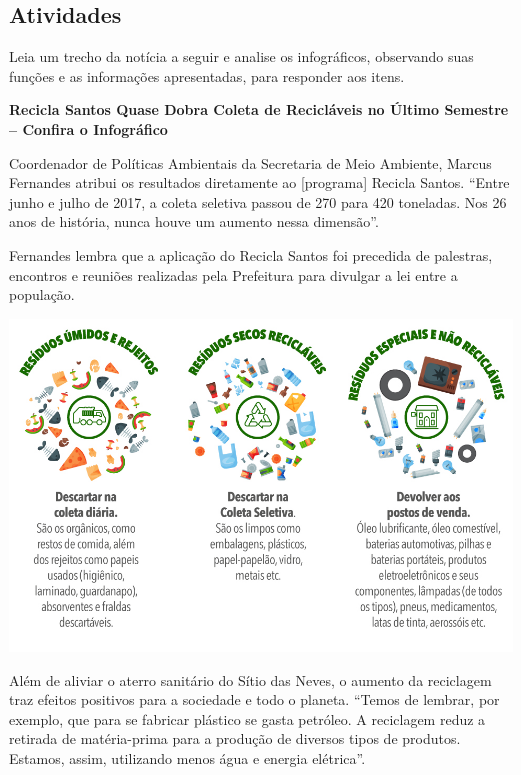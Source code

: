 \begin{conteudo}
\begin{conteudo}
\begin{conteudo}
\begin{conteudo}
\begin{conteudo}
\section*{Atividades}


Leia um trecho da notícia a seguir e analise os infográficos,
observando suas funções e as informações apresentadas, para responder aos itens.

\begin{myquote}
\textbf{Recicla Santos Quase Dobra Coleta de Recicláveis no Último
Semestre -- Confira o Infográfico}


Coordenador de Políticas Ambientais da Secretaria de Meio Ambiente,
Marcus Fernandes atribui os resultados diretamente ao [programa] Recicla Santos.
``Entre junho e julho de 2017, a coleta seletiva passou de 270 para 420
toneladas. Nos 26 anos de história, nunca houve um aumento nessa
dimensão''.

Fernandes lembra que a aplicação do Recicla Santos foi precedida de
palestras, encontros e reuniões realizadas pela Prefeitura para divulgar
a lei entre a população.

\begin{center}
\includegraphics[width=\textwidth]{media/image30.jpeg}
\end{center}

Além de aliviar o aterro sanitário do Sítio das Neves, o aumento da
reciclagem traz efeitos positivos para a sociedade e todo o planeta.
``Temos de lembrar, por exemplo, que para se fabricar plástico se gasta
petróleo. A reciclagem reduz a retirada de matéria-prima para a produção
de diversos tipos de produtos. Estamos, assim, utilizando menos água e
energia elétrica''.


\end{myquote}
\end{conteudo}
\end{conteudo}
\end{conteudo}
\end{conteudo}
\end{conteudo}
